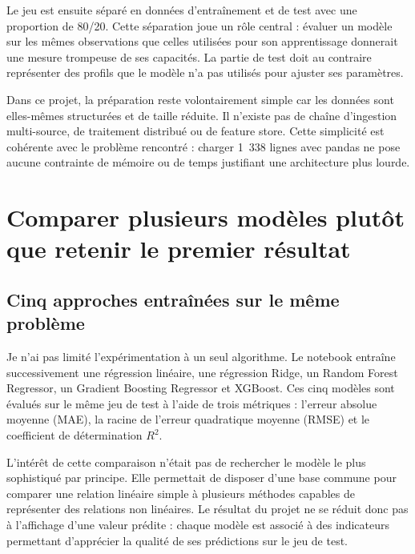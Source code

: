Le jeu est ensuite séparé en données d'entraînement et de test avec une proportion de 80/20. Cette séparation joue un rôle central : évaluer un modèle sur les mêmes observations que celles utilisées pour son apprentissage donnerait une mesure trompeuse de ses capacités. La partie de test doit au contraire représenter des profils que le modèle n'a pas utilisés pour ajuster ses paramètres.

Dans ce projet, la préparation reste volontairement simple car les données sont elles-mêmes structurées et de taille réduite. Il n'existe pas de chaîne d'ingestion multi-source, de traitement distribué ou de feature store. Cette simplicité est cohérente avec le problème rencontré : charger 1~338 lignes avec pandas ne pose aucune contrainte de mémoire ou de temps justifiant une architecture plus lourde.

\section{Comparer plusieurs modèles plutôt que retenir le premier résultat}

\subsection{Cinq approches entraînées sur le même problème}

Je n'ai pas limité l'expérimentation à un seul algorithme. Le notebook entraîne successivement une régression linéaire, une régression Ridge, un Random Forest Regressor, un Gradient Boosting Regressor et XGBoost. Ces cinq modèles sont évalués sur le même jeu de test à l'aide de trois métriques : l'erreur absolue moyenne (MAE), la racine de l'erreur quadratique moyenne (RMSE) et le coefficient de détermination $R^2$.

L'intérêt de cette comparaison n'était pas de rechercher le modèle le plus sophistiqué par principe. Elle permettait de disposer d'une base commune pour comparer une relation linéaire simple à plusieurs méthodes capables de représenter des relations non linéaires. Le résultat du projet ne se réduit donc pas à l'affichage d'une valeur prédite : chaque modèle est associé à des indicateurs permettant d'apprécier la qualité de ses prédictions sur le jeu de test.

